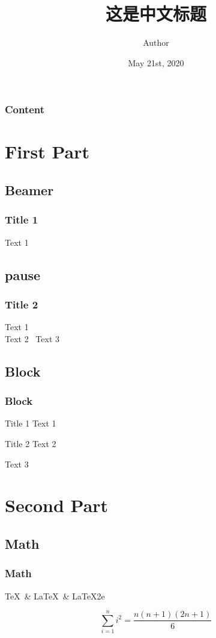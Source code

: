 \documentclass{beamer}
\title{这是中文标题}
\author{Author}
\institute{ZYZOI}
\date{May 21st, 2020}
\begin{document}
  \frame{\titlepage}

  \begin{frame}
    \frametitle{Content}
    \tableofcontents %
  \end{frame}

  \section{First Part}

    \subsection{Beamer}

    \begin{frame}
      \frametitle{Title 1}
      Text 1
    \end{frame}

    \subsection{pause}

    \begin{frame}
      \frametitle{Title 2}
      Text 1 \\
      \pause
      Text 2 \pause\ Text 3
    \end{frame}

    \subsection{Block}

    \begin{frame}
      \frametitle{Block}

      \begin{block}{Title 1}
        Text 1
      \end{block}

      \begin{block}{Title 2}
        Text 2
      \end{block}

      \begin{block}
        Text 3
      \end{block}
    \end{frame}

  \section{Second Part}

    \subsection{Math}

    \begin{frame}
      \frametitle{Math}

      \TeX\ \& \LaTeX\ \& \LaTeX2e\ %

      $$\sum_{i = 1} ^ {n} i ^ 2 = \frac{n (n + 1) (2n + 1)}{6}$$

    \end{frame}
\end{document}

